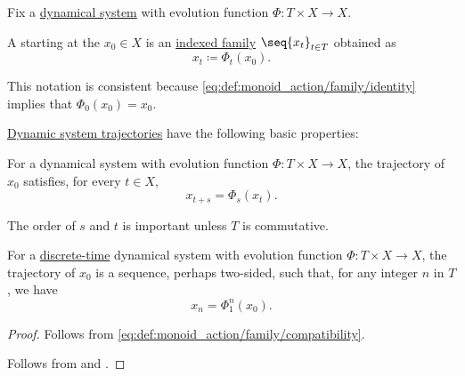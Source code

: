 \begin{definition}\label{def:dynamical_system_trajectory}\mimprovised
  Fix a \hyperref[def:dynamical_system]{dynamical system} with evolution function \( \Phi: T \times X \to X \).

  A  starting at the  \( x_0 \in X \) is an \hyperref[def:indexed_family]{indexed family} \( \seq{ x_t }_{t \in T} \) obtained as
  \begin{equation*}
    x_t \coloneqq \Phi_t(x_0).
  \end{equation*}
\end{definition}
\begin{comments}
  \item This notation is consistent because \eqref{eq:def:monoid_action/family/identity} implies that \( \Phi_0(x_0) = x_0 \).
\end{comments}

\begin{proposition}\label{thm:def:dynamical_system_trajectory}
  \hyperref[def:dynamical_system_trajectory]{Dynamic system trajectories} have the following basic properties:
  \begin{thmenum}
     For a dynamical system with evolution function \( \Phi: T \times X \to X \), the trajectory of \( x_0 \) satisfies, for every \( t \in X \),
    \begin{equation*}
      x_{t+s} = \Phi_s(x_t).
    \end{equation*}

    The order of \( s \) and \( t \) is important unless \( T \) is commutative.

     For a \hyperref[def:dynamical_system_time_classification]{discrete-time} dynamical system with evolution function \( \Phi: T \times X \to X \), the trajectory of \( x_0 \) is a sequence, perhaps two-sided, such that, for any integer \( n \) in \( T \), we have
    \begin{equation*}
      x_n = \Phi_1^n(x_0).
    \end{equation*}
  \end{thmenum}
\end{proposition}
\begin{proof}
   Follows from \eqref{eq:def:monoid_action/family/compatibility}.

   Follows from  and .
\end{proof}
